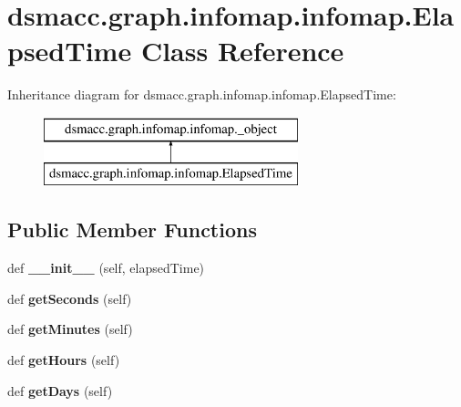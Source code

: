 \hypertarget{classdsmacc_1_1graph_1_1infomap_1_1infomap_1_1ElapsedTime}{}\section{dsmacc.\+graph.\+infomap.\+infomap.\+Elapsed\+Time Class Reference}
\label{classdsmacc_1_1graph_1_1infomap_1_1infomap_1_1ElapsedTime}
Inheritance diagram for dsmacc.\+graph.\+infomap.\+infomap.\+Elapsed\+Time\+:\begin{figure}[H]
\begin{center}
\leavevmode
\includegraphics[height=2.000000cm]{classdsmacc_1_1graph_1_1infomap_1_1infomap_1_1ElapsedTime}
\end{center}
\end{figure}
\subsection*{Public Member Functions}
\begin{DoxyCompactItemize}
\item 
\mbox{\label{classdsmacc_1_1graph_1_1infomap_1_1infomap_1_1ElapsedTime_a3d8b8dc1a4a09edd77ecbae9ac389350}} 
def {\bfseries \+\_\+\+\_\+init\+\_\+\+\_\+} (self, elapsed\+Time)
\item 
\mbox{\label{classdsmacc_1_1graph_1_1infomap_1_1infomap_1_1ElapsedTime_ac3e9ed4cb85653eb2ef7549949ad4f29}} 
def {\bfseries get\+Seconds} (self)
\item 
\mbox{\label{classdsmacc_1_1graph_1_1infomap_1_1infomap_1_1ElapsedTime_a1a97f9e7f57b19272ea70cf07d23bffb}} 
def {\bfseries get\+Minutes} (self)
\item 
\mbox{\label{classdsmacc_1_1graph_1_1infomap_1_1infomap_1_1ElapsedTime_abf7f1c4f3ed4bc1dc4d71eb4026a1b2c}} 
def {\bfseries get\+Hours} (self)
\item 
\mbox{\label{classdsmacc_1_1graph_1_1infomap_1_1infomap_1_1ElapsedTime_ac1051d7242aaf56691faeda6ebd32ee2}} 
def {\bfseries get\+Days} (self)
\end{DoxyCompactItemize}
